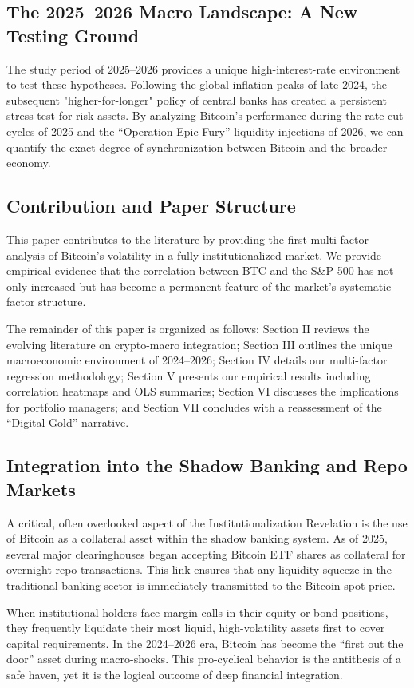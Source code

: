 \documentclass[10pt, conference, compsocconf]{IEEEtran}
\begin{document}
\subsection{The 2025--2026 Macro Landscape: A New Testing Ground}
The study period of 2025--2026 provides a unique high-interest-rate environment to test these hypotheses. Following the global inflation peaks of late 2024, the subsequent "higher-for-longer" policy of central banks has created a persistent stress test for risk assets. By analyzing Bitcoin’s performance during the rate-cut cycles of 2025 and the ``Operation Epic Fury'' liquidity injections of 2026, we can quantify the exact degree of synchronization between Bitcoin and the broader economy.

\subsection{Contribution and Paper Structure}
This paper contributes to the literature by providing the first multi-factor analysis of Bitcoin’s volatility in a fully institutionalized market. We provide empirical evidence that the correlation between BTC and the S\&P 500 has not only increased but has become a permanent feature of the market's systematic factor structure.

The remainder of this paper is organized as follows: Section II reviews the evolving literature on crypto-macro integration; Section III outlines the unique macroeconomic environment of 2024--2026; Section IV details our multi-factor regression methodology; Section V presents our empirical results including correlation heatmaps and OLS summaries; Section VI discusses the implications for portfolio managers; and Section VII concludes with a reassessment of the ``Digital Gold'' narrative.

\subsection{Integration into the Shadow Banking and Repo Markets}
A critical, often overlooked aspect of the Institutionalization Revelation is the use of Bitcoin as a collateral asset within the shadow banking system. As of 2025, several major clearinghouses began accepting Bitcoin ETF shares as collateral for overnight repo transactions. This link ensures that any liquidity squeeze in the traditional banking sector is immediately transmitted to the Bitcoin spot price. 

When institutional holders face margin calls in their equity or bond positions, they frequently liquidate their most liquid, high-volatility assets first to cover capital requirements. In the 2024--2026 era, Bitcoin has become the ``first out the door'' asset during macro-shocks. This pro-cyclical behavior is the antithesis of a safe haven, yet it is the logical outcome of deep financial integration.
\end{document}
